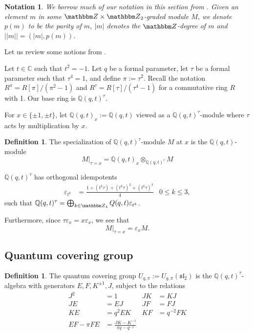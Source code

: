 \documentclass{amsart}
\def\Q{\mathsf{Q}}
\theoremstyle{plain}
\newtheorem{notation}[theorem]{Notation}
\theoremstyle{definition}
\newtheorem{definition}[theorem]{Definition}
\theoremstyle{definition}
\numberwithin{equation}{section}
\numberwithin{theorem}{section}
\def\mf{\mathfrak}
\def\Q{\mathbb{Q}}
\numberwithin{equation}{section}
\def\C{{\mathbb{C}}}
\def\Z{{\mathbbm Z}}
\begin{document}
\begin{notation}
  We borrow much of our notation in this section from \cite{C}. Given an element $m$ in some $\Z\times \Z_2$-graded module $M$, we denote $p(m)$ to be the parity of $m$, $|m|$ denotes the $\Z$-degree of $m$ and $||m||=(|m|,p(m))$.
\end{notation}

Let us review some notions from \cite[Section 2.2]{C}.

Let $t\in \C$ such that $t^2=-1$. Let $q$ be a formal parameter, let $\tau$ be a formal parameter such that $\tau^4=1$, and define $\pi:=\tau^2$.
Recall the notation $R^\pi=R[\pi]/(\pi^2-1)$ and $R^\tau = R[\tau]/(\tau^4-1)$ for a commutative ring $R$ with 1.
Our base ring is $\Q(q,t)^\tau$.

For $x\in \{\pm 1, \pm t\}$, let $\Q(q,t)_x:=\Q(q,t)$ viewed as a $\Q(q,t)^\tau$-module where $\tau$ acts by multiplication by $x$.
\begin{definition}
  The specialization of $\Q(q,t)^\tau$-module $M$ at $x$ is the $\Q(q,t)$-module \[M|_{\tau=x}=\Q(q,t)_x\otimes_{\Q(q,t)^\tau}M\]
\end{definition}

$\Q(q,t)^\tau$ has orthogonal idempotents
\begin{align*}
  \varepsilon_{t^k}&=\frac{1+(t^k\tau)+(t^k\tau)^2+(t^k\tau)^3}{4} & 0\leq k\leq 3,
\end{align*}
such that $\Q(q,t)^\tau=\bigoplus_{k\in \Z_4}Q(q,t)\varepsilon_{t^k}$.

Furthermore, since $\tau \varepsilon_x=x\varepsilon_x$, we see that
\[
M|_{\tau=x}=\varepsilon_x M.
\]


\subsection{Quantum covering group}\label{sec:covering-group}

\begin{definition}{\cite{CHW}}
  The quantum covering group $U_{q,\pi}:=U_{q,\pi}(\mf{sl}_2)$ is the $\Q(q,t)^\tau$-algebra with generators $E,F,K^{\pm 1},J$, subject to the relations
  \begin{align}\label{quantum-covering-group}
    J^2&=1 & JK&=KJ \\
    JE&=EJ & JF&=FJ \\
    KE&=q^2EK & KF&=q^{-2}FK \\
    EF-\pi FE &= \frac{JK-K^{-1}}{\pi q-q^{-1}}
  \end{align}
\end{definition}
\end{document}
